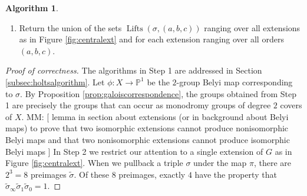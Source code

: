 \documentclass{dcthesis}
\newcommand{\PP}{\mathbb P}
\newcommand{\ZZ}{\mathbb Z}
\newcommand{\mm}[1]{{\color{blue} \sf MM: [#1]}}
\newcommand{\wt}[1]{\widetilde{#1}}
\DeclareMathOperator{\Lifts}{Lifts}
\DeclareMathOperator{\order}{order}
\theoremstyle{definition}
\newtheorem{alg}[prop]{Algorithm}
\theoremstyle{remark}
\numberwithin{equation}{section}
\numberwithin{figure}{section}
\begin{document}
{{\begin{alg}
\begin{enumerate}
\begin{enumerate}
              and $\langle\wt{\sigma}\rangle = \wt{G}$.
            \item
              For each $\wt{\sigma}\in\Lifts(\sigma)$ compute
              $\order(\wt{\sigma})\colonequals(\order(\wt{\sigma}_0), \order(\wt{\sigma}_1), \order(\wt{\sigma}_\infty))\in\ZZ^3$
              and sort $\Lifts(\sigma)$ according to $\order(\wt{\sigma})$.
              Let
              \begin{equation}
                \label{eqn:liftsorders}
                \Lifts(\sigma,(a,b,c))\colonequals
                \{
                  \wt{\sigma}\in\Lifts(\sigma) :
                  \order(\wt{\sigma}) = (a,b,c)
                \}.
              \end{equation}
            \item
              For each set of triples $\Lifts(\sigma,(a,b,c))$
              remove simultaneously conjugate triples so that
              $\Lifts(\sigma,(a,b,c))$ has exactly one representative
              from each simultaneous conjugacy class.
              \mm{TODO: reword}
          \end{enumerate}
        \item
          Return the union of the sets $\Lifts(\sigma,(a,b,c))$
          ranging over all extensions as in Figure
          \ref{fig:centralext}
          and for each extension ranging over all orders
          $(a,b,c)$.
      \end{enumerate}
    \end{alg}
    \begin{proof}[Proof of correctness]
      The algorithms in Step 1 are addressed in Section \ref{subsec:holtsalgorithm}.
      Let $\phi:X\to\PP^1$ be the $2$-group Belyi map corresponding to $\sigma$.
      By Proposition \ref{prop:galoiscorrespondence},
      the groups obtained from Step 1 are precisely the
      groups that can occur as monodromy groups of degree $2$ covers of $X$.
      \mm{
        lemma in section about extensions
        (or in background about Belyi maps)
        to prove
        that two isomorphic extensions cannot produce
        nonisomorphic Belyi maps
        and that two nonisomorphic extensions cannot produce
        isomorphic Belyi maps
      }
      In Step 2 we restrict our attention to a single extension of $G$
      as in Figure \ref{fig:centralext}.
      When we pullback a triple $\sigma$ under the map $\pi$,
      there are $2^3=8$ preimages $\wt{\sigma}$.
      Of these $8$ preimages, exactly $4$ have the property that
      $\wt{\sigma}_\infty\wt{\sigma}_1\wt{\sigma}_0=1$.

\end{proof}}}
\end{document}
